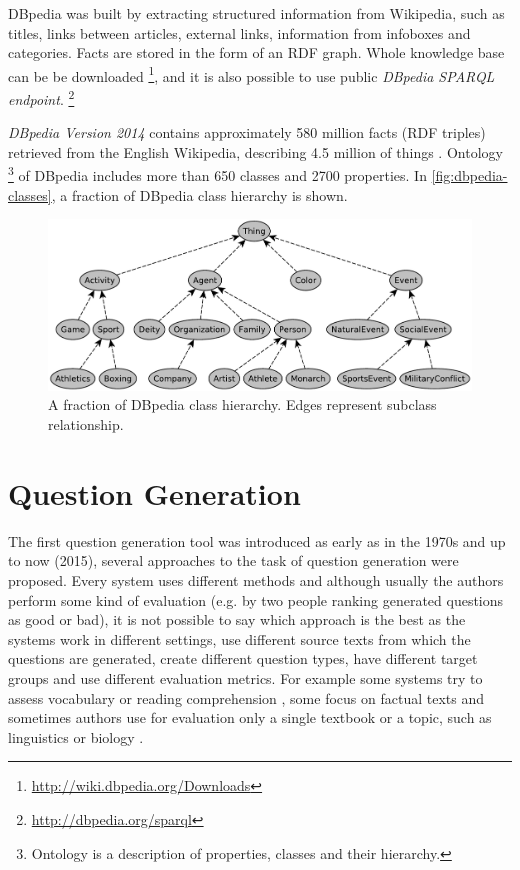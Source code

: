 \documentclass[12pt, twoside]{fithesis2}
\renewcommand{\_}{\leavevmode \kern0.07em\vbox{\hrule width0.4em}}
\begin{document}
DBpedia was built by extracting structured information from Wikipedia,
such as titles, links between articles, external links, information from infoboxes and categories.
Facts are stored in the form of an RDF graph.
Whole knowledge base can be be downloaded%
\footnote{\url{http://wiki.dbpedia.org/Downloads}}, %
and it is also possible to use public \textit{DBpedia SPARQL endpoint}.%
\footnote{\url{http://dbpedia.org/sparql}}

\emph{DBpedia Version 2014}
contains approximately 580 million facts (RDF triples) retrieved from the English Wikipedia,
describing 4.5 million of things \cite{dbpedia}.
Ontology%
\footnote{Ontology is a description of properties, classes and their hierarchy.}
of DBpedia includes more than 650 classes and 2700 properties.
In \autoref{fig:dbpedia-classes}, a fraction of DBpedia class hierarchy is shown.
\begin{figure}[h]
  \centering
  \includegraphics[width=\textwidth]{images/dbpedia-classes.pdf}
  \caption{A fraction of DBpedia class hierarchy. Edges represent subclass relationship.}
  \label{fig:dbpedia-classes}
\end{figure}


\chapter{Question Generation}
\label{chap:exercises}

The first question generation tool was introduced as early as in the 1970s \cite{questions-wolfe}
and up to now (2015), several approaches to the task of question generation were proposed.
Every system uses different methods and although usually the authors perform some kind of evaluation (e.g. by two people ranking generated questions as good or bad), it is not possible to say which approach is the best as the systems work in different settings, use different source texts from which the questions are generated, create different question types, have different target groups and use different evaluation metrics.
For example some systems try to assess vocabulary \cite{question-gen-vocabulary}
or reading comprehension \cite{question-overgenerating-rating},
some focus on factual texts \cite{question-gen-heilman}
and sometimes authors use for evaluation only a single textbook or a topic, such as linguistics \cite{question-gen-mitkov} or biology \cite{question-gen-textbooks}.
\end{document}
